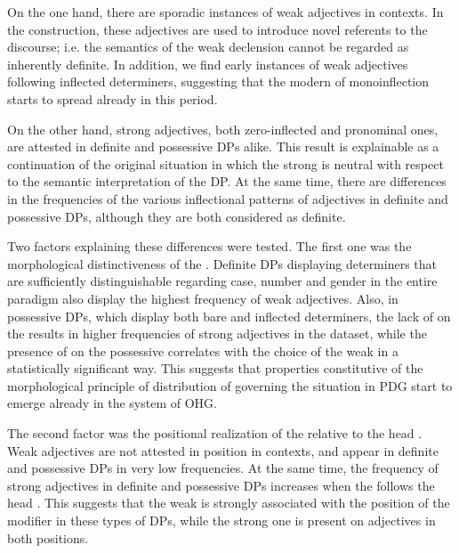 \documentclass[output=paper,colorlinks,citecolor=brown]{langscibook}
\begin{document}
On the one hand, there are sporadic instances of weak adjectives in
 contexts. In the  construction, these
adjectives are used to introduce novel referents to the discourse;  i.e.
the semantics of the weak declension cannot be regarded as inherently
definite. In addition, we find early instances of weak adjectives
following inflected  determiners, suggesting that the modern
  of monoinflection starts to spread already in this
period.

On the other hand, strong adjectives, both zero-inflected and pronominal
ones, are attested in definite and possessive DPs alike. This result is
explainable as a continuation of the original  situation in
which the strong  is neutral with respect to the semantic
interpretation of the DP. At the same time, there are differences in the
frequencies of the various inflectional patterns of adjectives in definite and
possessive DPs, although they are both considered as definite.

Two factors explaining these differences were tested. The first one was
the morphological distinctiveness of the . Definite DPs
displaying determiners that are sufficiently distinguishable regarding
case, number and gender in the entire paradigm also display the highest
frequency of weak adjectives. Also, in possessive DPs, which display both
bare and inflected determiners, the lack of  on the 
results in higher frequencies of strong adjectives in the dataset, while the
presence of  on the possessive  correlates with the
choice of the weak  in a statistically significant way. This
suggests that properties constitutive of the morphological principle of
distribution of  governing the situation in PDG
start to emerge already in the system of OHG.

The second factor was the positional realization of the 
relative to the head . Weak adjectives are not attested in
 position in  contexts, and appear in definite and
possessive DPs in very low frequencies. At the same time, the frequency of
strong adjectives in definite and possessive DPs increases when the
 follows the head . This suggests that the weak 
is strongly associated with the  position of the modifier in
these types of DPs, while the strong one is present on adjectives in
both positions.
\end{document}

